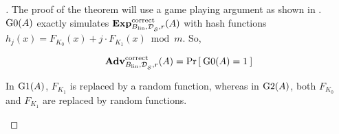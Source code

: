 \begin{proof}[]
The proof of the theorem will use a game playing argument as shown in . $\text{G0}(A)$ exactly simulates $\mathrm{\mathbf{Exp}}^{\mathrm{correct}}_{B_\mathrm{lin},\mathcal{D}_{{\cal S}}^{},r}(A)$ with hash functions $h_j(x) =  F_{K_0}(x) + j\cdot F_{K_1}(x) \bmod m$. So,

\begin{equation}
\mathrm{\mathbf{Adv}}^{\mathrm{correct}}_{B_{\mathrm{lin}},\mathcal{D}_{{\cal S}}^{},r}(A) = \Pr\left[\: \text{G0}(A)=1 \:\right]\label{eq:0}
\end{equation}

 In $\text{G1}(A)$, $F_{K_1}$ is replaced by a random function, whereas in $\text{G2}(A)$, both $F_{K_0}$ and $F_{K_1}$ are replaced by random functions.

\begin{figure}
\centering
{}
\end{figure}
\end{proof}
